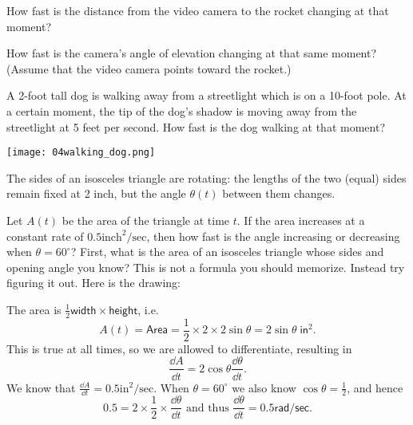 \begin{multicols}{2}
\subprob How fast is the distance from the video camera to the
rocket changing at that moment?

\subprob How fast is the camera's angle of elevation changing at that
same moment?  (Assume that the video camera points toward the
rocket.)


\problem \groupproblem A 2-foot tall dog is walking away from a streetlight
which is on a 10-foot pole. At a certain moment, the tip of the dog's
shadow is moving away from the streetlight at 5 feet per second. How fast
is the dog walking at that moment? 

\noindent%
\centerline{\texttt{[image: 04walking\_dog.png]}}



\problem The sides of an isosceles triangle are rotating: the lengths of
the two (equal) sides remain fixed at 2 inch, but the angle $\theta(t)$
between them changes.

Let $A(t)$ be the area of the triangle at time $t$.  If the area increases at
a constant rate of $0.5\text{inch}^2/\text{sec}$, then how fast is the angle
increasing or decreasing when $\theta=60^\circ$?
\answer
First, what is the area of an isosceles triangle whose sides and opening
angle you know?  This is not a formula you should memorize.  Instead try
figuring it out.  Here is the drawing:
\begin{center}
  
\end{center}
The area is $\frac12 \mathsf{width}\times\mathsf{height}$, i.e.
\[
A(t)
= \mathsf{Area}
= \frac12 \times 2 \times2\sin\theta
= 2\sin\theta \; \mathsf{in}^2.
\]
This is true at all times, so we are allowed to differentiate, resulting in
\[
\frac{\dd A} {\dd t} = 2\cos \theta \frac{\dd \theta} {\dd t}.
\]
We know that $\frac{\dd A} {\dd t} = 0.5 \text{in}^2/\text{sec}$.
When $\theta=60^\circ$ we also know $\cos \theta = \frac{1} {2}$, and hence
\[
0.5 = 2\times\frac{1} {2} \times \frac{\dd \theta} {\dd t}
\text{ and thus }
\frac{\dd \theta} {\dd t} = 0.5 \mathsf{rad}/\mathsf{sec}.
\]
\endanswer


\end{multicols}
